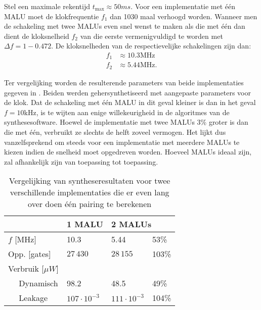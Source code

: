 Stel een maximale rekentijd $t_{\text{max}} \approx 50ms$. Voor een implementatie met \'e\'en MALU moet de klokfrequentie $f_1$ dan 1030 maal verhoogd worden. Wanneer men de schakeling met twee MALUs even snel wenst te maken als die met \'e\'en dan dient de kloksnelheid $f_2$ van die eerste vermenigvuldigd te worden met $\Delta f = 1 - 0.472$.
De kloksnelheden van de respectievelijke schakelingen zijn dan:
\[\begin{aligned}
f_1	&\approx 10.3\text{MHz}\\
f_2	&\approx 5.44\text{MHz}.
\end{aligned}\]

Ter vergelijking worden de resulterende parameters van beide implementaties gegeven in . Beiden werden gehersynthetiseerd met aangepaste parameters voor de klok. Dat de schakeling met \'e\'en MALU in dit geval kleiner is dan in het geval $f = 10$kHz, is te wijten aan enige willekeurigheid in de algoritmes van de synthesesoftware. Hoewel de implementatie met twee MALUs 3\% groter is dan die met \'e\'en, verbruikt ze slechts de helft zoveel vermogen. Het lijkt dus vanzelfsprekend om steeds voor een implementatie met meerdere MALUs te kiezen indien de snelheid moet opgedreven worden. Hoeveel MALUs ideaal zijn, zal afhankelijk zijn van toepassing tot toepassing.

\begin{table}[h]
	\caption{Vergelijking van syntheseresultaten voor twee verschillende implementaties die er even lang over doen \'e\'en pairing te berekenen}
	\label{tabel-resultaten-m1-vs-m2}

	\centering
	\begin{tabular}{lll@{$\;\;$}l}
		\toprule
		& 1 MALU	& \multicolumn{2}{l}{2 MALUs}\\
		\midrule
		$f$ [MHz]					& 10.3						& 5.44						& 53\% \\ 
		Opp. [gates]				& $27\,430$					& $28\,155$					& 103\% \\
		Verbruik [$\mu W$]		& 								& 								& \\
		$\quad$ Dynamisch			& 98.2						& 48.5						& 49\% \\
		$\quad$ Leakage			& $107 \cdot 10^{-3}$	& $111 \cdot 10^{-3}$	& 104\% \\
		\bottomrule	
	\end{tabular}
\end{table}

